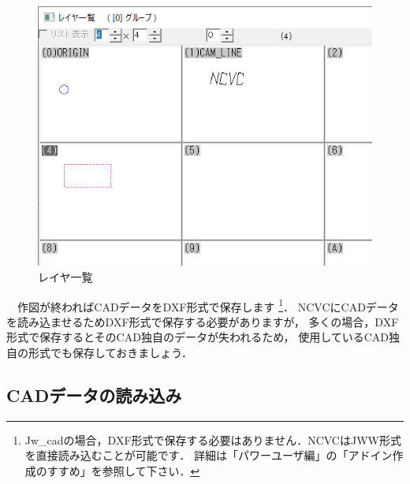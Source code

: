 \vspace*{1zh}
\begin{figure}[H]
\centering
\includegraphics{No1/fig/sampleLayer.png}
\caption{レイヤ一覧}
\label{fig:sampleLayer.png}
\end{figure}

　作図が終わればCADデータをDXF形式で保存します
\footnote{
    Jw\_cadの場合，DXF形式で保存する必要はありません．NCVCはJWW形式を直接読み込むことが可能です．
    詳細は「パワーユーザ編」の「アドイン作成のすすめ」を参照して下さい．
}．
NCVCにCADデータを読み込ませるためDXF形式で保存する必要がありますが，
多くの場合，DXF形式で保存するとそのCAD独自のデータが失われるため，
使用しているCAD独自の形式でも保存しておきましょう．

\subsection{CADデータの読み込み}

